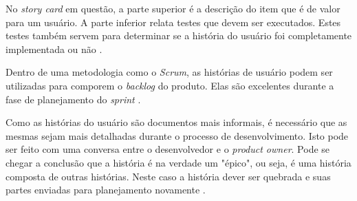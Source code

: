 No \emph{story card} em questão, a parte superior é a descrição do item que é de valor para um usuário. 
A parte inferior relata testes que devem ser executados. 
Estes testes também servem para determinar se a história do usuário foi completamente implementada ou não \cite{cohn2004}.

Dentro de uma metodologia como o \emph{Scrum}, as histórias de usuário podem ser utilizadas para comporem o \emph{backlog} do produto. 
Elas são excelentes durante a fase de planejamento do \emph{sprint} \cite{Hanley2015}. 

Como as histórias do usuário são documentos mais informais, é necessário que as mesmas sejam mais detalhadas durante o processo de desenvolvimento. 
Isto pode ser feito com uma conversa entre o desenvolvedor e o \emph{product owner}. 
Pode se chegar a conclusão que a história é na verdade um "épico", ou seja, é uma história composta de outras histórias. 
Neste caso a história dever ser quebrada e suas partes enviadas para planejamento novamente \cite{cohn2004}. 


